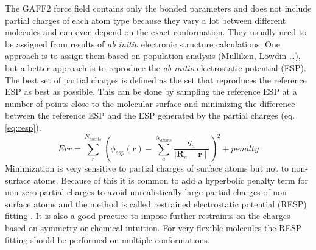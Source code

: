 The GAFF2 force field contains only the bonded parameters and does not include partial charges of each atom type because they vary a lot between different molecules and can even depend on the exact conformation. They usually need to be assigned from results of \textit{ab initio} electronic structure calculations. One approach is to assign them based on population analysis (Mulliken, L\"owdin \ldots), but a better approach is to reproduce the \textit{ab initio} electrostatic potential (ESP). The best set of partial charges is defined as the set that reproduces the reference ESP as best as possible. This can be done by sampling the reference ESP at a number of points close to the molecular surface and minimizing the difference between the reference ESP and the ESP generated by the partial charges (eq.\,\ref{eq:resp}).
\begin{equation} \label{eq:resp}
    Err = \sum_{r}^{N_{points}} \left(  \phi_{esp}(\textbf{r}) - \sum_{a}^{N_{atoms}} \frac{q_a}{\mid \textbf{R}_a - \textbf{r} \mid}  \right)^2 + penalty
\end{equation}
Minimization is very sensitive to partial charges of surface atoms but not to non-surface atoms. Because of this it is common to add a hyperbolic penalty term for non-zero partial charges to avoid unrealistically large partial charges of non-surface atoms and the method is called restrained electrostatic potential (RESP) fitting \cite{Bayly1993}. It is also a good practice to impose further restraints on the charges based on symmetry or chemical intuition. For very flexible molecules the RESP fitting should be performed on multiple conformations.


